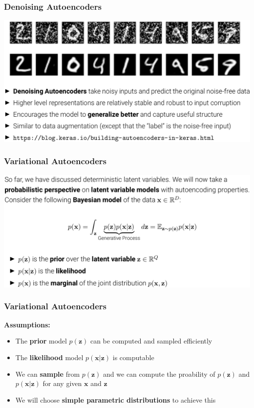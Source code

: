 \documentclass[10pt,aspectratio=169]{beamer}
\begin{document}
\begin{frame}
  \frametitle{Denoising Autoencoders}
\begin{center}
\includegraphics[width=.9\textwidth]{images/s34}
\end{center}
\end{frame}



\begin{frame}
  \frametitle{Variational Autoencoders}
\begin{center}
\includegraphics[width=.95\textwidth]{images/s36A}
\end{center}
\end{frame}


\begin{frame}
  \frametitle{Variational Autoencoders}
\small{\textbf{Assumptions:}
\vspace{.4cm}
\begin{itemize}[<+->]
\setlength\itemsep{.8em}
\item The \textbf{prior} model $p(\mathbf{z})$ can be computed and sampled efficiently
\item The \textbf{likelihood} model $p(\mathbf{x}|\mathbf{z})$ is computable
\item We can \textbf{sample} from $p(\mathbf{z})$ and we can compute the proability
of $p(\mathbf{z})$ and $p(\mathbf{x}|\mathbf{z})$ for any given $\mathbf{x}$ and $\mathbf{z}$
\item We will choose \textbf{simple parametric distributions} to achieve this
\end{itemize}
}
\end{frame}
\end{document}
